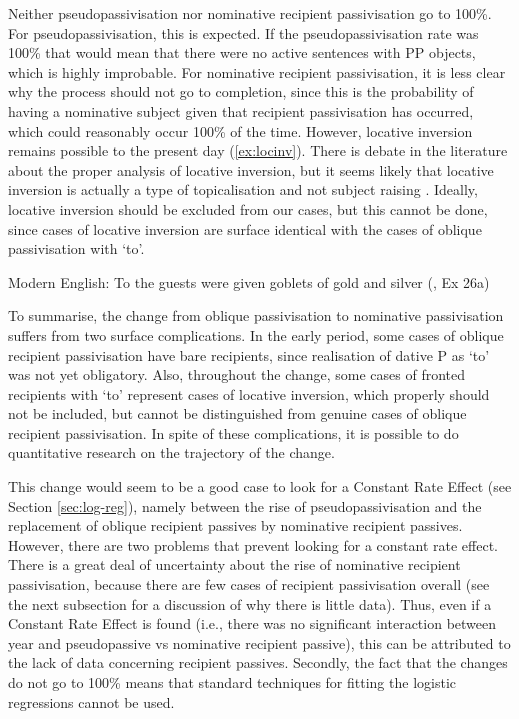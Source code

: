 	Neither pseudopassivisation nor nominative recipient passivisation go to 100\%. For pseudopassivisation, this is expected. If the pseudopassivisation rate was 100\% that would mean that there were no active sentences with PP objects, which is highly improbable. For nominative recipient passivisation, it is less clear why the process should not go to completion, since this is the probability of having a nominative subject given that recipient passivisation has occurred, which could reasonably occur 100\% of the time. However, locative inversion remains possible to the present day (\ref{ex:locinv}). There is debate in the literature about the proper analysis of locative inversion, but it seems likely that locative inversion is actually a type of topicalisation and not subject raising \citep{Bresnan.1994}. Ideally, locative inversion should be excluded from our cases, but this cannot be done, since cases of locative inversion are surface identical with the cases of oblique passivisation with `to'.

	\begin{exe}
		\ex Modern English: To the guests were given goblets of gold and silver (\citealt{Bruening.2010}, Ex 26a)
	\end{exe}

	To summarise, the change from oblique passivisation to nominative passivisation suffers from two surface complications. In the early period, some cases of oblique recipient passivisation have bare recipients, since realisation of dative P as `to' was not yet obligatory. Also, throughout the change, some cases of fronted recipients with `to' represent cases of locative inversion, which properly should not be included, but cannot be distinguished from genuine cases of oblique recipient passivisation. In spite of these complications, it is possible to do quantitative research on the trajectory of the change.

	This change would seem to be a good case to look for a Constant Rate Effect (see Section \ref{sec:log-reg}), namely between the rise of pseudopassivisation and the replacement of oblique recipient passives by nominative recipient passives. However, there are two problems that prevent looking for a constant rate effect. There is a great deal of uncertainty about the rise of nominative recipient passivisation, because there are few cases of recipient passivisation overall (see the next subsection for a discussion of why there is little data). Thus, even if a Constant Rate Effect is found (i.e., there was no significant interaction between year and pseudopassive vs nominative recipient passive), this can be attributed to the lack of data concerning recipient passives. Secondly, the fact that the changes do not go to 100\% means that standard techniques for fitting the logistic regressions cannot be used.

